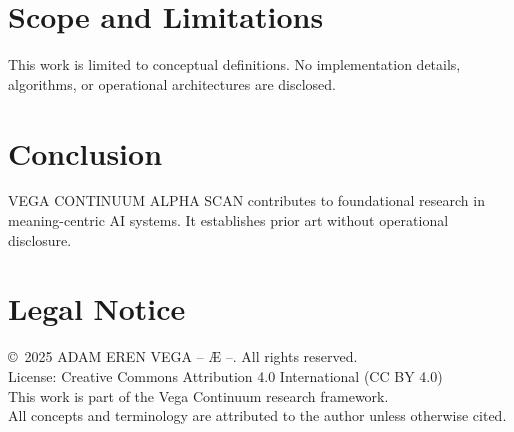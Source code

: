 \documentclass[12pt,a4paper]{article}
\begin{document}
\section{Scope and Limitations}
This work is limited to conceptual definitions. No implementation details, algorithms, or operational architectures are disclosed.

\section{Conclusion}
VEGA CONTINUUM ALPHA SCAN contributes to foundational research in meaning-centric AI systems. It establishes prior art without operational disclosure.

\section*{Legal Notice}
\copyright\ 2025 ADAM EREN VEGA – Æ –. All rights reserved.\\
License: Creative Commons Attribution 4.0 International (CC BY 4.0)\\
This work is part of the Vega Continuum research framework.\\
All concepts and terminology are attributed to the author unless otherwise cited.
\end{document}
